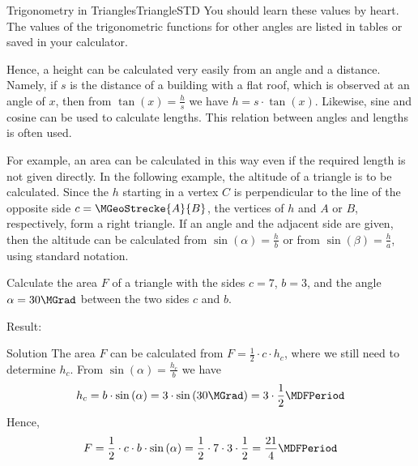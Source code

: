 \begin{MXContent}{Trigonometry in Triangles}{Triangle}{STD}
You should learn these values by heart. The values of the trigonometric functions for other
angles are listed in tables or saved in your calculator.

Hence, a height can be calculated very easily from an angle and a distance. 
Namely, if $s$ is the distance of a building with a flat roof, which is observed 
at an angle of $x$, then from $\tan(x) = \frac{h}{s}$ we have  $h = s \cdot \tan(x)$. 
Likewise, sine and cosine can be used to calculate lengths. This relation between 
angles and lengths is often used.

For example, an area can be calculated in this way even if the required 
length is not given directly. In the following example, the altitude
of a triangle is to be calculated. Since the $h$ starting in a vertex $C$ 
is perpendicular to the line of the opposite side
$c = \MGeoStrecke{A}{B}$, the vertices of $h$ and  $A$ or $B$, respectively, 
form a right triangle. If an angle and the adjacent side are given, then 
the altitude can be calculated from $\sin(\alpha) = \frac{h}{b}$ or from
$\sin(\beta) = \frac{h}{a}$, using standard notation.


\begin{MExercise}
Calculate the area $F$ of a triangle with the sides $c = 7$, $b = 3$,  and 
the angle $\alpha = 30\MGrad$ between the two sides $c$ and $b$.

Result: %

\begin{MHint}{Solution}
The area $F$ can be calculated from $F =\frac{1}{2}\cdot c \cdot h_c$, where we
still need to determine $h_c$. From $\sin\left(\alpha\right)=\frac{h_c}{b}$
we have
\[
 h_c=b\cdot\sin\left(\alpha\right) %
  = 3\cdot\sin\left(30\MGrad\right) %
  = 3\cdot\frac{1}{2} \MDFPeriod %
\]
Hence,
\[ 
F =\frac{1}{2}\cdot c\cdot b\cdot\sin\left(\alpha\right) %
  =\frac{1}{2}\cdot 7 \cdot3\cdot\frac{1}{2}=\frac{21}{4} \MDFPeriod %
\]
\end{MHint}
\end{MExercise}

\end{MXContent}


